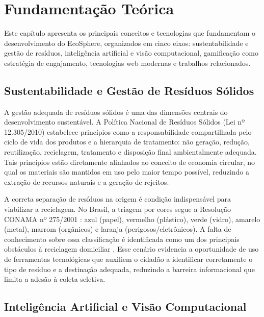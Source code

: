 \documentclass[
	12pt,
	openright,
	oneside,
	a4paper,
	chapter=TITLE,
	section=TITLE,
	subsection=TITLE,
	subsubsection=TITLE,
	english,
	brazil
	]{abntex2}
\begin{document}
\chapter{Fundamentação Teórica}

Este capítulo apresenta os principais conceitos e tecnologias que fundamentam o desenvolvimento do EcoSphere, organizados em cinco eixos: sustentabilidade e gestão de resíduos, inteligência artificial e visão computacional, gamificação como estratégia de engajamento, tecnologias web modernas e trabalhos relacionados.

\section{Sustentabilidade e Gestão de Resíduos Sólidos}

A gestão adequada de resíduos sólidos é uma das dimensões centrais do desenvolvimento sustentável. A Política Nacional de Resíduos Sólidos (Lei nº 12.305/2010) \cite{PNRS2010} estabelece princípios como a responsabilidade compartilhada pelo ciclo de vida dos produtos e a hierarquia de tratamento: não geração, redução, reutilização, reciclagem, tratamento e disposição final ambientalmente adequada. Tais princípios estão diretamente alinhados ao conceito de economia circular, no qual os materiais são mantidos em uso pelo maior tempo possível, reduzindo a extração de recursos naturais e a geração de rejeitos.

A correta separação de resíduos na origem é condição indispensável para viabilizar a reciclagem. No Brasil, a triagem por cores segue a Resolução CONAMA nº 275/2001 \cite{CONAMA275}: azul (papel), vermelho (plástico), verde (vidro), amarelo (metal), marrom (orgânicos) e laranja (perigosos/eletrônicos). A falta de conhecimento sobre essa classificação é identificada como um dos principais obstáculos à reciclagem domiciliar \cite{IPEA2012}. Esse cenário evidencia a oportunidade de uso de ferramentas tecnológicas que auxiliem o cidadão a identificar corretamente o tipo de resíduo e a destinação adequada, reduzindo a barreira informacional que limita a adesão à coleta seletiva.

\section{Inteligência Artificial e Visão Computacional}
\end{document}

